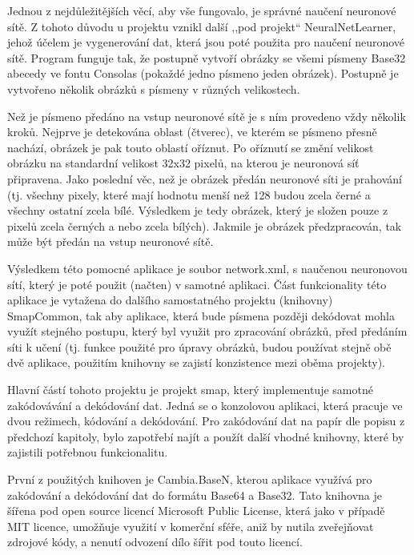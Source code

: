 \documentclass[conference]{IEEEtran}
\begin{document}
Jednou z nejdůležitějších věcí, aby vše fungovalo, je správné naučení neuronové sítě. Z tohoto důvodu u projektu vznikl další ,,pod projekt`` NeuralNetLearner, jehož účelem je vygenerování dat, která jsou poté použita pro naučení neuronové sítě. Program funguje tak, že postupně vytvoří obrázky se všemi písmeny Base32 abecedy ve fontu Consolas (pokaždé jedno písmeno jeden obrázek). Postupně je vytvořeno několik obrázků s písmeny v různých velikostech. 

Než je písmeno předáno na vstup neuronové sítě je s ním provedeno vždy několik kroků. Nejprve je detekována oblast (čtverec), ve kterém se písmeno přesně nachází, obrázek je pak touto oblastí oříznut. Po oříznutí se změní velikost obrázku na standardní velikost 32x32 pixelů, na kterou je neuronová síť připravena. Jako poslední věc, než je obrázek předán neuronové síti je prahování (tj. všechny pixely, které mají hodnotu menší než 128 budou zcela černé a všechny ostatní zcela bílé. Výsledkem je tedy obrázek, který je složen pouze z pixelů zcela černých a nebo zcela bílých). Jakmile je obrázek předzpracován, tak může být předán na vstup neuronové sítě. 

Výsledkem této pomocné aplikace je soubor network.xml, s naučenou neuronovou sítí, který je poté použit (načten) v samotné aplikaci. Část funkcionality této aplikace je vytažena do dalšího samostatného projektu (knihovny) SmapCommon, tak aby aplikace, která bude písmena později dekódovat mohla využít stejného postupu, který byl využit pro zpracování obrázků, před předáním síti k učení (tj. funkce použité pro úpravy obrázků, budou používat stejně obě dvě aplikace, použitím knihovny se zajistí konzistence mezi oběma projekty).

Hlavní částí tohoto projektu je projekt smap, který implementuje samotné zakódovávání a dekódování dat. Jedná se o konzolovou aplikaci, která pracuje ve dvou režimech, kódování a dekódování. Pro zakódování dat na papír dle popisu z předchozí kapitoly, bylo zapotřebí najít a použít další vhodné knihovny, které by zajistili potřebnou funkcionalitu.

První z použitých knihoven je Cambia.BaseN, kterou aplikace využívá pro zakódování a dekódování dat do formátu Base64 a Base32. Tato knihovna je šířena pod open source licencí Microsoft Public License, která jako v případě MIT licence, umožňuje využití v komerční sféře, aniž by nutila zveřejňovat zdrojové kódy, a nenutí odvození dílo šířit pod touto licencí.

\end{document}
